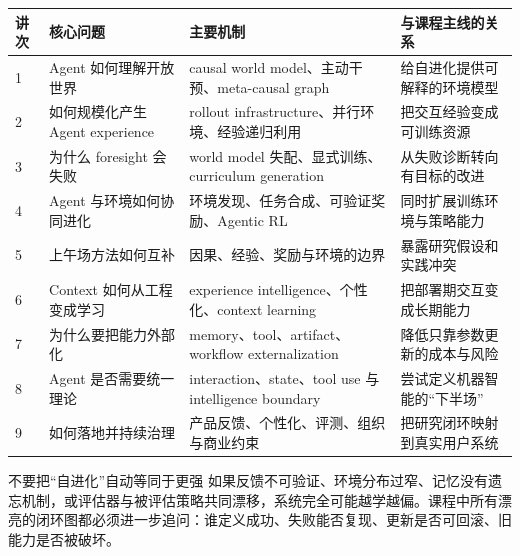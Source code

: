 \begin{longtable}{p{}p{}p{}p{}}
\toprule
讲次 & 核心问题 & 主要机制 & 与课程主线的关系 \\
\midrule
1 & Agent 如何理解开放世界 & causal world model、主动干预、meta-causal graph & 给自进化提供可解释的环境模型 \\
2 & 如何规模化产生 Agent experience & rollout infrastructure、并行环境、经验递归利用 & 把交互经验变成可训练资源 \\
3 & 为什么 foresight 会失败 & world model 失配、显式训练、curriculum generation & 从失败诊断转向有目标的改进 \\
4 & Agent 与环境如何协同进化 & 环境发现、任务合成、可验证奖励、Agentic RL & 同时扩展训练环境与策略能力 \\
5 & 上午场方法如何互补 & 因果、经验、奖励与环境的边界 & 暴露研究假设和实践冲突 \\
6 & Context 如何从工程变成学习 & experience intelligence、个性化、context learning & 把部署期交互变成长期能力 \\
7 & 为什么要把能力外部化 & memory、tool、artifact、workflow externalization & 降低只靠参数更新的成本与风险 \\
8 & Agent 是否需要统一理论 & interaction、state、tool use 与 intelligence boundary & 尝试定义机器智能的“下半场” \\
9 & 如何落地并持续治理 & 产品反馈、个性化、评测、组织与商业约束 & 把研究闭环映射到真实用户系统 \\
\bottomrule
\end{longtable}

\begin{warningbox}{不要把“自进化”自动等同于更强}
如果反馈不可验证、环境分布过窄、记忆没有遗忘机制，或评估器与被评估策略共同漂移，系统完全可能越学越偏。课程中所有漂亮的闭环图都必须进一步追问：谁定义成功、失败能否复现、更新是否可回滚、旧能力是否被破坏。
\end{warningbox}


